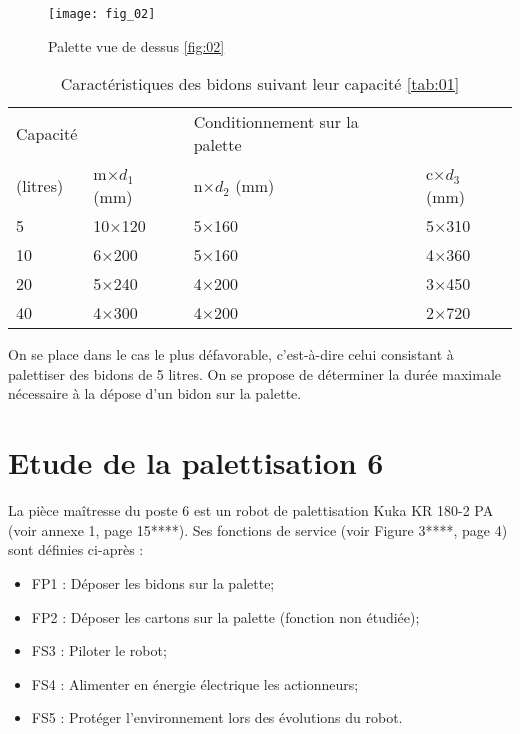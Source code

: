 \begin{figure}[H]
\centering
\texttt{[image: fig\_02]}
\caption{Palette vue de dessus \ref{fig:02}}
\end{figure}


\begin{table}[H]
\centering
\begin{tabular}{llll}
\hline
Capacité & & Conditionnement sur la palette & \\
(litres) 	& m×$d_1$ (mm)	& n×$d_2$ (mm)	& c×$d_3$ (mm)  \\
5	& 10×120	& 5×160	& 5×310 \\
10	& 6×200	& 5×160	& 4×360 \\
20	& 5×240	& 4×200	& 3×450 \\
40	& 4×300	& 4×200	& 2×720 \\
\hline
\end{tabular}
\caption{Caractéristiques des bidons suivant leur capacité \ref{tab:01}}
\end{table} 

On se place dans le cas le plus défavorable, c'est-à-dire celui consistant à 
palettiser des bidons de 5 litres. On se propose de déterminer la durée maximale nécessaire à 
la dépose d’un bidon sur la palette. 






\section{Etude de la palettisation 6}
La pièce maîtresse du poste 6 est un robot de palettisation Kuka KR 180-2 PA (voir annexe 1, 
page 15****). Ses fonctions de service (voir Figure 3****, page 4) sont définies ci-après : 
\begin{itemize}
\item FP1 : Déposer les bidons sur la palette;
\item FP2 : Déposer les cartons sur la palette (fonction non étudiée);
\item FS3 : Piloter le robot;
\item FS4 : Alimenter en énergie électrique les actionneurs;
\item FS5 : Protéger l’environnement lors des évolutions du robot.
\end{itemize}


